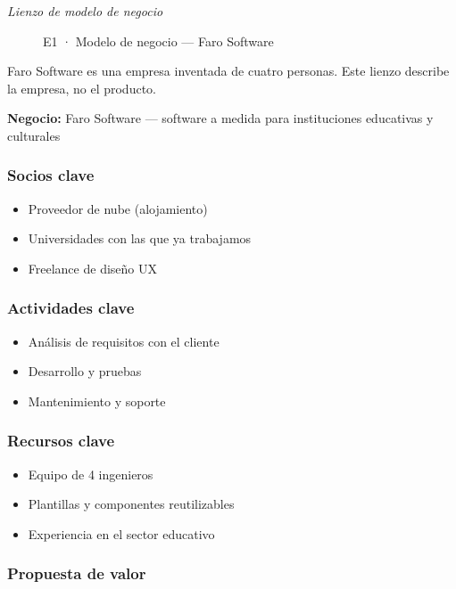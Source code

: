 \emph{Lienzo de modelo de negocio}

\begin{figure}[H]
\centering
{}
\caption{E1 · Modelo de negocio — Faro Software}
\end{figure}

Faro Software es una empresa inventada de cuatro personas. Este lienzo describe la empresa, no el producto.

\textbf{Negocio:} Faro Software — software a medida para instituciones educativas y culturales

\subsubsection*{Socios clave}

\begin{itemize}
\item Proveedor de nube (alojamiento)
\item Universidades con las que ya trabajamos
\item Freelance de diseño UX
\end{itemize}

\subsubsection*{Actividades clave}

\begin{itemize}
\item Análisis de requisitos con el cliente
\item Desarrollo y pruebas
\item Mantenimiento y soporte
\end{itemize}

\subsubsection*{Recursos clave}

\begin{itemize}
\item Equipo de 4 ingenieros
\item Plantillas y componentes reutilizables
\item Experiencia en el sector educativo
\end{itemize}

\subsubsection*{Propuesta de valor}

